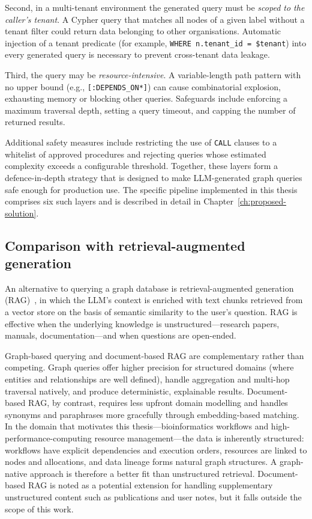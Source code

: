 \documentclass[a4paper,noexaminfo]{sapthesis}
\begin{document}
Second, in a multi-tenant environment the generated query must be
\emph{scoped to the caller's tenant}.  A Cypher query that matches all
nodes of a given label without a tenant filter could return data belonging
to other organisations.  Automatic injection of a tenant predicate (for
example, \texttt{WHERE n.tenant\_id = \$tenant}) into every generated query
is necessary to prevent cross-tenant data leakage.

Third, the query may be \emph{resource-intensive}.  A variable-length path
pattern with no upper bound (e.g., \texttt{[:DEPENDS\_ON*]}) can cause
combinatorial explosion, exhausting memory or blocking other queries.
Safeguards include enforcing a maximum traversal depth, setting a query
timeout, and capping the number of returned results.

Additional safety measures include restricting the use of \texttt{CALL}
clauses to a whitelist of approved procedures and rejecting queries whose
estimated complexity exceeds a configurable threshold.  Together,
these layers form a defence-in-depth strategy that is designed to make
LLM-generated graph queries safe enough for production use.  The specific
pipeline implemented in this thesis comprises six such layers and is
described in detail in Chapter~\ref{ch:proposed-solution}.

\subsection{Comparison with retrieval-augmented generation}

An alternative to querying a graph database is retrieval-augmented
generation (RAG)~\cite{lewis2020rag}, in which the LLM's context is
enriched with text chunks retrieved from a vector store on the basis of
semantic similarity to the user's question.  RAG is effective when the
underlying knowledge is unstructured---research papers, manuals,
documentation---and when questions are open-ended.

Graph-based querying and document-based RAG are complementary rather than
competing.  Graph queries offer higher precision for structured domains
(where entities and relationships are well defined), handle aggregation and
multi-hop traversal natively, and produce deterministic, explainable
results.  Document-based RAG, by contrast, requires less upfront domain
modelling and handles synonyms and paraphrases more gracefully through
embedding-based matching.  In the domain that motivates this
thesis---bioinformatics workflows and high-performance-computing resource
management---the data is inherently structured: workflows have explicit
dependencies and execution orders, resources are linked to nodes and
allocations, and data lineage forms natural graph structures.  A
graph-native approach is therefore a better fit than unstructured retrieval.
Document-based RAG is noted as a potential extension for handling
supplementary unstructured content such as publications and user notes, but
it falls outside the scope of this work.
\end{document}
